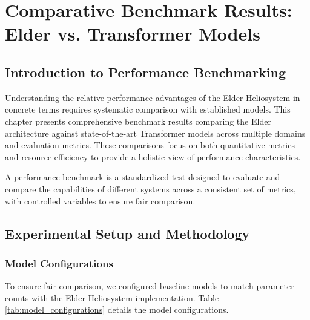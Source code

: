 \chapter{Comparative Benchmark Results: Elder vs. Transformer Models}

\section{Introduction to Performance Benchmarking}

Understanding the relative performance advantages of the Elder Heliosystem in concrete terms requires systematic comparison with established models. This chapter presents comprehensive benchmark results comparing the Elder architecture against state-of-the-art Transformer models across multiple domains and evaluation metrics. These comparisons focus on both quantitative metrics and resource efficiency to provide a holistic view of performance characteristics.

\begin{definition}
A performance benchmark is a standardized test designed to evaluate and compare the capabilities of different systems across a consistent set of metrics, with controlled variables to ensure fair comparison.
\end{definition}

\section{Experimental Setup and Methodology}

\subsection{Model Configurations}

To ensure fair comparison, we configured baseline models to match parameter counts with the Elder Heliosystem implementation. Table \ref{tab:model_configurations} details the model configurations.

